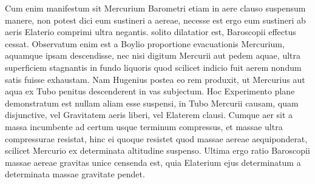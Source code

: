   Cum enim manifestum  sit Mercurium\protect{} Barometri\protect{} etiam in aere clauso suspensum manere,  non potest dici eum sustineri a  aereae, necesse est ergo eum sustineri ab aeris Elaterio\protect{} comprimi ultra negantis.    solito dilatatior est, Baroscopii\protect{} effectus  cessat. Observatum enim est a Boylio\protect{} proportione evacuationis Mercurium\protect{}, aquamque ipsam descendisse, nec nisi  digitum Mercurii\protect{} aut pedem aquae, ultra superficiem  stagnantis in fundo liquoris  quod scilicet indicio  fuit aerem  nondum satis fuisse exhaustam. Nam Hugenius \protect{}  postea eo rem produxit, ut Mercurius\protect{} aut aqua ex Tubo  penitus descenderent in vas subjectum. Hoc Experimento  plane demonstratum est nullam aliam esse suspensi,  in Tubo   Mercurii\protect{} causam, quam disjunctive, vel Gravitatem aeris\protect{} 
 liberi, vel Elaterem clausi. Cumque  aer sit a massa incumbente ad certum usque terminum compressus, et massae ultra compressurae resistat, hinc ei quoque resistet quod massae aereae aequiponderat, scilicet Mercurio ex determinata altitudine suspenso. Ultima ergo  ratio Baroscopii  massae aereae gravitas unice censenda est, quia Elaterium ejus determinatum a determinata massae gravitate  pendet.%
